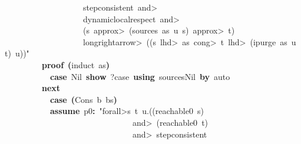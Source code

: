 \documentclass{article}
\newcommand{\syntaxKEYWORDA}[1]{\textcolor[rgb]{0.0,0.4,0.6}{\textbf{#1}}}
\newcommand{\syntaxKEYWORDC}[1]{\textcolor[rgb]{0.0,0.6,1.0}{\textbf{#1}}}
\newcommand{\syntaxLITERALA}[1]{\textcolor[rgb]{1.0,0.0,0.8}{#1}}
\newcommand{\syntaxOPERATOR}[1]{\textcolor[rgb]{0.0,0.0,0.0}{\textbf{#1}}}
\newcommand{\syntaxKEYWORDA}[1]{\textcolor[rgb]{0.0,0.4,0.6}{\textbf{#1}}}
\newcommand{\syntaxKEYWORDC}[1]{\textcolor[rgb]{0.0,0.6,1.0}{\textbf{#1}}}
\newcommand{\syntaxLITERALA}[1]{\textcolor[rgb]{1.0,0.0,0.8}{#1}}
\newcommand{\syntaxOPERATOR}[1]{\textcolor[rgb]{0.0,0.0,0.0}{\textbf{#1}}}
\newcommand{\syntaxKEYWORDA}[1]{\textcolor[rgb]{0.0,0.4,0.6}{\textbf{#1}}}
\newcommand{\syntaxKEYWORDC}[1]{\textcolor[rgb]{0.0,0.6,1.0}{\textbf{#1}}}
\newcommand{\syntaxLITERALA}[1]{\textcolor[rgb]{1.0,0.0,0.8}{#1}}
\newcommand{\syntaxOPERATOR}[1]{\textcolor[rgb]{0.0,0.0,0.0}{\textbf{#1}}}
\newcommand{\syntaxKEYWORDA}[1]{\textcolor[rgb]{0.0,0.4,0.6}{#1}}
\newcommand{\syntaxKEYWORDC}[1]{\textcolor[rgb]{0.0,0.6,1.0}{#1}}
\newcommand{\syntaxLITERALA}[1]{\textcolor[rgb]{1.0,0.0,0.8}{\textbf{#1}}}
\newcommand{\syntaxOPERATOR}[1]{\textcolor[rgb]{0.0,0.0,0.0}{#1}}
\newcommand{\syntaxKEYWORDA}[1]{\textcolor[rgb]{0.0,0.4,0.6}{\textbf{#1}}}
\newcommand{\syntaxKEYWORDC}[1]{\textcolor[rgb]{0.0,0.6,1.0}{\textbf{#1}}}
\newcommand{\syntaxLITERALA}[1]{\textcolor[rgb]{1.0,0.0,0.8}{#1}}
\newcommand{\syntaxOPERATOR}[1]{\textcolor[rgb]{0.0,0.0,0.0}{\textbf{#1}}}
\newcommand{\syntaxKEYWORDA}[1]{\textcolor[rgb]{0.0,0.4,0.6}{\textbf{#1}}}
\newcommand{\syntaxKEYWORDC}[1]{\textcolor[rgb]{0.0,0.6,1.0}{\textbf{#1}}}
\newcommand{\syntaxLITERALA}[1]{\textcolor[rgb]{1.0,0.0,0.8}{#1}}
\newcommand{\syntaxOPERATOR}[1]{\textcolor[rgb]{0.0,0.0,0.0}{\textbf{#1}}}
\begin{document}
\syntaxLITERALA{{\ }{\ }{\ }{\ }{\ }{\ }{\ }{\ }{\ }{\ }{\ }{\ }{\ }{\ }{\ }{\ }{\ }{\ }{\ }{\ }step\usebox{\underscorebox}consistent{\ }\<and>}\hspace*{\fill}\\
\syntaxLITERALA{{\ }{\ }{\ }{\ }{\ }{\ }{\ }{\ }{\ }{\ }{\ }{\ }{\ }{\ }{\ }{\ }{\ }{\ }{\ }{\ }dynamic\usebox{\underscorebox}local\usebox{\underscorebox}respect{\ }\<and>}\hspace*{\fill}\\
\syntaxLITERALA{{\ }{\ }{\ }{\ }{\ }{\ }{\ }{\ }{\ }{\ }{\ }{\ }{\ }{\ }{\ }{\ }{\ }{\ }{\ }{\ }(s{\ }\<approx>{\ }(sources{\ }as{\ }u{\ }s){\ }\<approx>{\ }t)}\hspace*{\fill}\\
\syntaxLITERALA{{\ }{\ }{\ }{\ }{\ }{\ }{\ }{\ }{\ }{\ }{\ }{\ }{\ }{\ }{\ }{\ }{\ }{\ }{\ }{\ }\<longrightarrow>{\ }((s{\ }\<lhd>{\ }as{\ }\<cong>{\ }t{\ }\<lhd>{\ }(ipurge{\ }as{\ }u{\ }t){\ }\usebox{\atbox}{\ }u))"}\hspace*{\fill}\\
{\ }{\ }{\ }{\ }{\ }{\ }{\ }{\ }{\ }{\ }\syntaxKEYWORDA{proof}{\ }\syntaxOPERATOR{(}induct{\ }as\syntaxOPERATOR{)}\hspace*{\fill}\\
{\ }{\ }{\ }{\ }{\ }{\ }{\ }{\ }{\ }{\ }{\ }{\ }\syntaxKEYWORDC{case}{\ }Nil{\ }\syntaxKEYWORDC{show}{\ }?case{\ }\syntaxKEYWORDA{using}{\ }sources\usebox{\underscorebox}Nil{\ }\syntaxKEYWORDA{by}{\ }auto\hspace*{\fill}\\
{\ }{\ }{\ }{\ }{\ }{\ }{\ }{\ }{\ }{\ }\syntaxKEYWORDA{next}\hspace*{\fill}\\
{\ }{\ }{\ }{\ }{\ }{\ }{\ }{\ }{\ }{\ }{\ }{\ }\syntaxKEYWORDC{case}{\ }\syntaxOPERATOR{(}Cons{\ }b{\ }bs\syntaxOPERATOR{)}\hspace*{\fill}\\
{\ }{\ }{\ }{\ }{\ }{\ }{\ }{\ }{\ }{\ }{\ }{\ }\syntaxKEYWORDC{assume}{\ }p0\syntaxOPERATOR{:}{\ }\syntaxLITERALA{"\<forall>s{\ }t{\ }u.((reachable0{\ }s){\ }}\hspace*{\fill}\\
\syntaxLITERALA{{\ }{\ }{\ }{\ }{\ }{\ }{\ }{\ }{\ }{\ }{\ }{\ }{\ }{\ }{\ }{\ }{\ }{\ }{\ }{\ }{\ }{\ }{\ }{\ }{\ }{\ }{\ }{\ }{\ }{\ }{\ }{\ }\<and>{\ }(reachable0{\ }t){\ }}\hspace*{\fill}\\
\syntaxLITERALA{{\ }{\ }{\ }{\ }{\ }{\ }{\ }{\ }{\ }{\ }{\ }{\ }{\ }{\ }{\ }{\ }{\ }{\ }{\ }{\ }{\ }{\ }{\ }{\ }{\ }{\ }{\ }{\ }{\ }{\ }{\ }{\ }\<and>{\ }step\usebox{\underscorebox}consistent{\ }}\hspace*{\fill}\\
\end{document}

